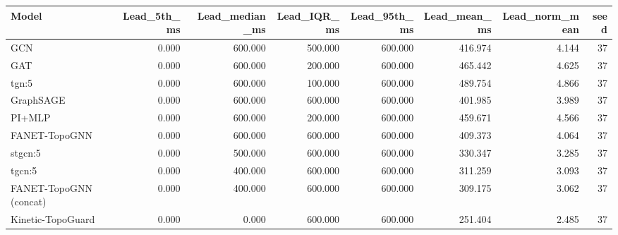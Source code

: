 \begin{tabular}{lrrrrrrr}
\toprule
Model & Lead\_5th\_ms & Lead\_median\_ms & Lead\_IQR\_ms & Lead\_95th\_ms & Lead\_mean\_ms & Lead\_norm\_mean & seed \\
\midrule
GCN & 0.000 & 600.000 & 500.000 & 600.000 & 416.974 & 4.144 & 37 \\
GAT & 0.000 & 600.000 & 200.000 & 600.000 & 465.442 & 4.625 & 37 \\
tgn:5 & 0.000 & 600.000 & 100.000 & 600.000 & 489.754 & 4.866 & 37 \\
GraphSAGE & 0.000 & 600.000 & 600.000 & 600.000 & 401.985 & 3.989 & 37 \\
PI+MLP & 0.000 & 600.000 & 200.000 & 600.000 & 459.671 & 4.566 & 37 \\
FANET-TopoGNN & 0.000 & 600.000 & 600.000 & 600.000 & 409.373 & 4.064 & 37 \\
stgcn:5 & 0.000 & 500.000 & 600.000 & 600.000 & 330.347 & 3.285 & 37 \\
tgcn:5 & 0.000 & 400.000 & 600.000 & 600.000 & 311.259 & 3.093 & 37 \\
FANET-TopoGNN (concat) & 0.000 & 400.000 & 600.000 & 600.000 & 309.175 & 3.062 & 37 \\
Kinetic-TopoGuard & 0.000 & 0.000 & 600.000 & 600.000 & 251.404 & 2.485 & 37 \\
\bottomrule
\end{tabular}
